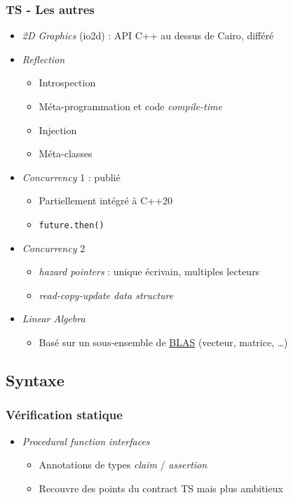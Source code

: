 \documentclass[C++.tex]{subfiles}
\begin{document}
\begin{frame}[fragile]
	\frametitle{TS - Les autres}
	\begin{itemize}
		\item \textit{2D Graphics} (io2d) : API C++ au dessus de Cairo, différé


		\item \textit{Reflection}
		\begin{itemize}
			\item Introspection
			\item Méta-programmation et code \textit{compile-time}
			\item Injection
			\item Méta-classes
		\end{itemize}


		\item \textit{Concurrency} 1 : publié
		\begin{itemize}
			\item Partiellement intégré à C++20
			\item \lstinline|future.then()|
		\end{itemize}
		\item \textit{Concurrency} 2
		\begin{itemize}
			\item \textit{hazard pointers} : unique écrivain, multiples lecteurs
			\item \textit{read-copy-update data structure}
		\end{itemize}
		\item \textit{Linear Algebra}
			\begin{itemize}
				\item Basé sur un sous-ensemble de \href{https://www.netlib.org/blas/}{BLAS} (vecteur, matrice, \ldots{})
			\end{itemize}
	\end{itemize}
\end{frame}

\subsection*{Syntaxe}
\begin{frame}[fragile]
	\frametitle{Vérification statique}
	\begin{itemize}
		\item \textit{Procedural function interfaces} 
		\begin{itemize}
			\item Annotations de types \textit{claim} / \textit{assertion}
			\item Recouvre des points du contract TS mais plus ambitieux
		\end{itemize}
	\end{itemize}
\end{frame}
\end{document}
